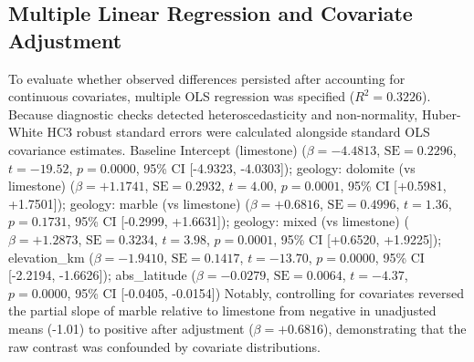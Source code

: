 \documentclass[sn-basic,Numbered]{sn-jnl}%
\begin{document}
\subsection{Multiple Linear Regression and Covariate Adjustment}
To evaluate whether observed differences persisted after accounting for continuous covariates, multiple OLS regression was specified ($R^2 = 0.3226$). Because diagnostic checks detected heteroscedasticity and non-normality, Huber-White HC3 robust standard errors were calculated alongside standard OLS covariance estimates. Baseline Intercept (limestone) ($\beta = -4.4813$, $\text{SE} = 0.2296$, $t = -19.52$, $p = 0.0000$, 95\% CI [-4.9323, -4.0303]); geology: dolomite (vs limestone) ($\beta = +1.1741$, $\text{SE} = 0.2932$, $t = 4.00$, $p = 0.0001$, 95\% CI [+0.5981, +1.7501]); geology: marble (vs limestone) ($\beta = +0.6816$, $\text{SE} = 0.4996$, $t = 1.36$, $p = 0.1731$, 95\% CI [-0.2999, +1.6631]); geology: mixed (vs limestone) ($\beta = +1.2873$, $\text{SE} = 0.3234$, $t = 3.98$, $p = 0.0001$, 95\% CI [+0.6520, +1.9225]); elevation\_km ($\beta = -1.9410$, $\text{SE} = 0.1417$, $t = -13.70$, $p = 0.0000$, 95\% CI [-2.2194, -1.6626]); abs\_latitude ($\beta = -0.0279$, $\text{SE} = 0.0064$, $t = -4.37$, $p = 0.0000$, 95\% CI [-0.0405, -0.0154]) Notably, controlling for covariates reversed the partial slope of marble relative to limestone from negative in unadjusted means (-1.01\text{\textperthousand}) to positive after adjustment ($\beta = +0.6816$), demonstrating that the raw contrast was confounded by covariate distributions.
\end{document}
